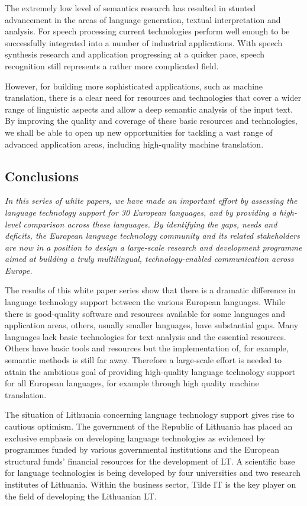 \begin{multicols}{2}
    The extremely low level of semantics research has resulted in stunted advancement in the areas of language generation, textual interpretation and analysis. For speech processing current technologies perform well enough to be successfully integrated into a number of industrial applications. With speech synthesis research and application progressing at a quicker pace, speech recognition still represents a rather more complicated field.

    However, for building more sophisticated applications, such as machine translation, there is a clear need for resources and technologies that cover a wider range of linguistic aspects and allow a deep semantic analysis of the input text. By improving the quality and coverage of these basic resources and technologies, we shall be able to open up new opportunities for tackling a vast range of advanced application areas, including high-quality machine translation.

\subsection{Conclusions}

\emph{In this series of white papers, we have made an important effort by assessing the language technology support for 30 European languages, and by providing a high-level comparison across these languages. By identifying the gaps, needs and deficits, the European language technology community and its related stakeholders are now in a position to design a large-scale research and development programme aimed at building a truly multilingual, technology-enabled communication across Europe.}

The results of this white paper series show that there is a dramatic difference in language technology support between the various European languages. While there is good-quality software and resources available for some languages and application areas, others, usually smaller languages, have substantial gaps. Many languages lack basic technologies for text analysis and the essential resources. Others have basic tools and resources but the implementation of, for example, semantic methods is still far away. Therefore a large-scale effort is needed to attain the ambitious goal of providing high-quality language technology support for all European languages, for example through high quality machine translation. 

The situation of Lithuania concerning language technology support gives rise to cautious optimism. The government of the Republic of Lithuania has placed an exclusive emphasis on developing language technologies as evidenced by programmes funded by various governmental institutions and the European structural funds’ financial resources for the development of LT. A scientific base for language technologies is being developed by four universities and two research institutes of Lithuania. Within the business sector, Tilde IT is the key player on the field of developing the Lithuanian LT.


\end{multicols}
